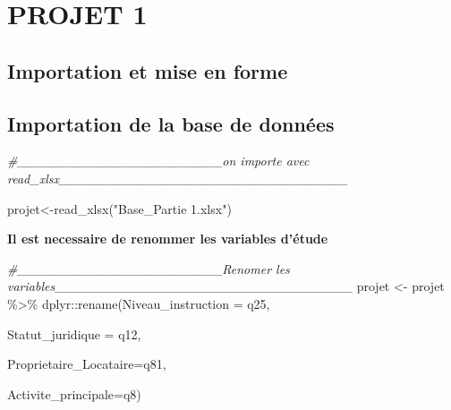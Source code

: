 \documentclass[
  14pt,
]{article}
\newenvironment{Shaded}{\begin{snugshade}}{\end{snugshade}}
\newcommand{\AttributeTok}[1]{\textcolor[rgb]{0.77,0.63,0.00}{#1}}
\newcommand{\CommentTok}[1]{\textcolor[rgb]{0.56,0.35,0.01}{\textit{#1}}}
\newcommand{\FunctionTok}[1]{\textcolor[rgb]{0.00,0.00,0.00}{#1}}
\newcommand{\NormalTok}[1]{#1}
\newcommand{\OtherTok}[1]{\textcolor[rgb]{0.56,0.35,0.01}{#1}}
\newcommand{\SpecialCharTok}[1]{\textcolor[rgb]{0.00,0.00,0.00}{#1}}
\newcommand{\StringTok}[1]{\textcolor[rgb]{0.31,0.60,0.02}{#1}}
\begin{document}
\newpage

\hypertarget{projet-1}{%
\section{PROJET 1}\label{projet-1}}

\hypertarget{importation-et-mise-en-forme}{%
\subsection{Importation et mise en
forme}\label{importation-et-mise-en-forme}}

\hypertarget{importation-de-la-base-de-donnuxe9es}{%
\subsection{\texorpdfstring{Importation de la base de données\\
}{Importation de la base de données }}\label{importation-de-la-base-de-donnuxe9es}}

\begin{Shaded}
\begin{Highlighting}[]
\CommentTok{\#\_\_\_\_\_\_\_\_\_\_\_\_\_\_\_\_\_\_\_\_\_\_on importe avec read\_xlsx\_\_\_\_\_\_\_\_\_\_\_\_\_\_\_\_\_\_\_\_\_\_\_\_\_\_\_\_\_\_\_}

\NormalTok{projet}\OtherTok{\textless{}{-}}\FunctionTok{read\_xlsx}\NormalTok{(}\StringTok{"Base\_Partie 1.xlsx"}\NormalTok{)  }
\end{Highlighting}
\end{Shaded}

\textbf{Il est necessaire de renommer les variables d'étude}\\

\begin{Shaded}
\begin{Highlighting}[]
\CommentTok{\#\_\_\_\_\_\_\_\_\_\_\_\_\_\_\_\_\_\_\_\_\_\_Renomer les variables\_\_\_\_\_\_\_\_\_\_\_\_\_\_\_\_\_\_\_\_\_\_\_\_\_\_\_\_\_\_\_\_}
\NormalTok{projet }\OtherTok{\textless{}{-}}\NormalTok{ projet }\SpecialCharTok{\%\textgreater{}\%} 
\NormalTok{  dplyr}\SpecialCharTok{::}\FunctionTok{rename}\NormalTok{(}\AttributeTok{Niveau\_instruction =}\NormalTok{ q25,}
                
                \AttributeTok{Statut\_juridique =}\NormalTok{ q12,}
                
                \AttributeTok{Proprietaire\_Locataire=}\NormalTok{q81,}
                       
                \AttributeTok{Activite\_principale=}\NormalTok{q8)}
\end{Highlighting}
\end{Shaded}
\end{document}
